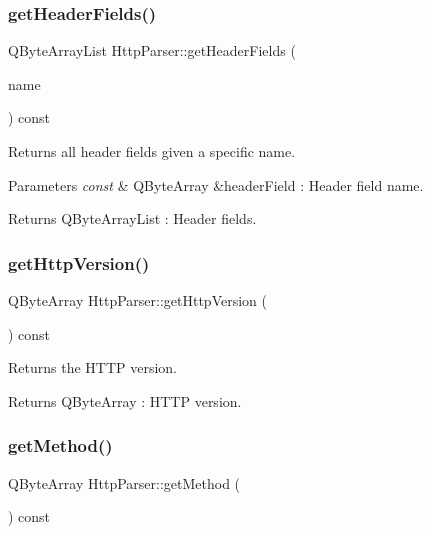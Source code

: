 \subsubsection{\texorpdfstring{get\+Header\+Fields()}{getHeaderFields()}}
{\footnotesize\ttfamily Q\+Byte\+Array\+List Http\+Parser\+::get\+Header\+Fields (\begin{DoxyParamCaption}\item[{const Q\+Byte\+Array \&}]{name }\end{DoxyParamCaption}) const}



Returns all header fields given a specific name. 


\begin{DoxyParams}{Parameters}
{\em const} & Q\+Byte\+Array \&header\+Field \+: Header field name. \\
\hline
\end{DoxyParams}
\begin{DoxyReturn}{Returns}
Q\+Byte\+Array\+List \+: Header fields. 
\end{DoxyReturn}
\mbox{\label{class_http_parser_a760eb9ec81fa1983b8eb5b088b0e6f41}} 
\subsubsection{\texorpdfstring{get\+Http\+Version()}{getHttpVersion()}}
{\footnotesize\ttfamily Q\+Byte\+Array Http\+Parser\+::get\+Http\+Version (\begin{DoxyParamCaption}{ }\end{DoxyParamCaption}) const}



Returns the H\+T\+TP version. 

\begin{DoxyReturn}{Returns}
Q\+Byte\+Array \+: H\+T\+TP version. 
\end{DoxyReturn}
\mbox{\label{class_http_parser_a283aa2b313491a592babdb5528086f71}} 
\subsubsection{\texorpdfstring{get\+Method()}{getMethod()}}
{\footnotesize\ttfamily Q\+Byte\+Array Http\+Parser\+::get\+Method (\begin{DoxyParamCaption}{ }\end{DoxyParamCaption}) const}



